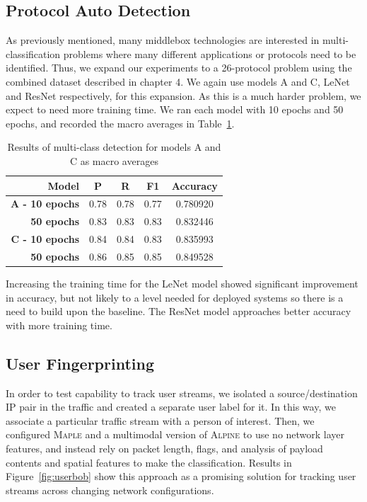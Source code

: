 \subsection{Protocol Auto Detection}

As previously mentioned, many middlebox technologies are interested in multi-classification problems where many different applications or protocols need to be identified. Thus, we expand our experiments to a 26-protocol problem using the combined dataset described in chapter 4. We again use models A and C, LeNet and ResNet respectively, for this expansion. As this is a much harder problem, we expect to need more training time. We ran each model with 10 epochs and 50 epochs, and recorded the macro averages in Table~\ref{tab:multiresults}.

\begin{table} [h!]
\centering
\begin{tabular}{| r | c | c | c | c |}
\hline
Model & P & R & F1 & Accuracy \\
\hline
\textbf{A - 10 epochs} & 0.78 & 0.78 & 0.77 & 0.780920\\
\textbf{50 epochs} & 0.83 & 0.83 & 0.83 & 0.832446 \\
\hline
\textbf{C - 10 epochs} & 0.84 & 0.84 & 0.83 & 0.835993 \\
\textbf{50 epochs} & 0.86 & 0.85 & 0.85 & 0.849528\\
\hline
\end{tabular}
\caption{Results of multi-class detection for models A and C as macro averages}
\label{tab:multiresults}
\end{table}

Increasing the training time for the LeNet model showed significant improvement in accuracy, but not likely to a level needed for deployed systems so there is a need to build upon the baseline. The ResNet model approaches better accuracy with more training time.

\subsection{User Fingerprinting}
In order to test capability to track user streams, we isolated a source/destination IP pair in the traffic and created a separate user label for it. In this way, we associate a particular traffic stream with a person of interest. Then, we configured \textsc{Maple} and a multimodal version of \textsc{Alpine} to use no network layer features, and instead rely on packet length, flags, and analysis of payload contents and spatial features to make the classification. Results in Figure~\ref{fig:userbob} show this approach as a promising solution for tracking user streams across changing network configurations.

